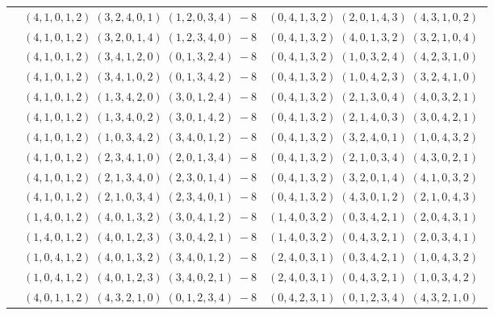 \documentclass[11pt]{article}
\begin{document}
\begin{longtable}[l]{|c|c|c|}
 \cline{2-3} 
 & $(4 ,1 ,0 ,1 ,2) \;(3 ,2 ,4 ,0 ,1) \;(1 ,2 ,0 ,3 ,4) \;-8$ & $(0 ,4 ,1 ,3 ,2) \;(2 ,0 ,1 ,4 ,3) \;(4 ,3 ,1 ,0 ,2) \;$\\ 
 \cline{2-3} 
 & $(4 ,1 ,0 ,1 ,2) \;(3 ,2 ,0 ,1 ,4) \;(1 ,2 ,3 ,4 ,0) \;-8$ & $(0 ,4 ,1 ,3 ,2) \;(4 ,0 ,1 ,3 ,2) \;(3 ,2 ,1 ,0 ,4) \;$\\ 
 \cline{2-3} 
 & $(4 ,1 ,0 ,1 ,2) \;(3 ,4 ,1 ,2 ,0) \;(0 ,1 ,3 ,2 ,4) \;-8$ & $(0 ,4 ,1 ,3 ,2) \;(1 ,0 ,3 ,2 ,4) \;(4 ,2 ,3 ,1 ,0) \;$\\ 
 \cline{2-3} 
 & $(4 ,1 ,0 ,1 ,2) \;(3 ,4 ,1 ,0 ,2) \;(0 ,1 ,3 ,4 ,2) \;-8$ & $(0 ,4 ,1 ,3 ,2) \;(1 ,0 ,4 ,2 ,3) \;(3 ,2 ,4 ,1 ,0) \;$\\ 
 \cline{2-3} 
 & $(4 ,1 ,0 ,1 ,2) \;(1 ,3 ,4 ,2 ,0) \;(3 ,0 ,1 ,2 ,4) \;-8$ & $(0 ,4 ,1 ,3 ,2) \;(2 ,1 ,3 ,0 ,4) \;(4 ,0 ,3 ,2 ,1) \;$\\ 
 \cline{2-3} 
 & $(4 ,1 ,0 ,1 ,2) \;(1 ,3 ,4 ,0 ,2) \;(3 ,0 ,1 ,4 ,2) \;-8$ & $(0 ,4 ,1 ,3 ,2) \;(2 ,1 ,4 ,0 ,3) \;(3 ,0 ,4 ,2 ,1) \;$\\ 
 \cline{2-3} 
 & $(4 ,1 ,0 ,1 ,2) \;(1 ,0 ,3 ,4 ,2) \;(3 ,4 ,0 ,1 ,2) \;-8$ & $(0 ,4 ,1 ,3 ,2) \;(3 ,2 ,4 ,0 ,1) \;(1 ,0 ,4 ,3 ,2) \;$\\ 
 \cline{2-3} 
 & $(4 ,1 ,0 ,1 ,2) \;(2 ,3 ,4 ,1 ,0) \;(2 ,0 ,1 ,3 ,4) \;-8$ & $(0 ,4 ,1 ,3 ,2) \;(2 ,1 ,0 ,3 ,4) \;(4 ,3 ,0 ,2 ,1) \;$\\ 
 \cline{2-3} 
 & $(4 ,1 ,0 ,1 ,2) \;(2 ,1 ,3 ,4 ,0) \;(2 ,3 ,0 ,1 ,4) \;-8$ & $(0 ,4 ,1 ,3 ,2) \;(3 ,2 ,0 ,1 ,4) \;(4 ,1 ,0 ,3 ,2) \;$\\ 
 \cline{2-3} 
 & $(4 ,1 ,0 ,1 ,2) \;(2 ,1 ,0 ,3 ,4) \;(2 ,3 ,4 ,0 ,1) \;-8$ & $(0 ,4 ,1 ,3 ,2) \;(4 ,3 ,0 ,1 ,2) \;(2 ,1 ,0 ,4 ,3) \;$\\ 
 \cline{2-3} 
 & $(1 ,4 ,0 ,1 ,2) \;(4 ,0 ,1 ,3 ,2) \;(3 ,0 ,4 ,1 ,2) \;-8$ & $(1 ,4 ,0 ,3 ,2) \;(0 ,3 ,4 ,2 ,1) \;(2 ,0 ,4 ,3 ,1) \;$\\ 
 \cline{2-3} 
 & $(1 ,4 ,0 ,1 ,2) \;(4 ,0 ,1 ,2 ,3) \;(3 ,0 ,4 ,2 ,1) \;-8$ & $(1 ,4 ,0 ,3 ,2) \;(0 ,4 ,3 ,2 ,1) \;(2 ,0 ,3 ,4 ,1) \;$\\ 
 \cline{2-3} 
 & $(1 ,0 ,4 ,1 ,2) \;(4 ,0 ,1 ,3 ,2) \;(3 ,4 ,0 ,1 ,2) \;-8$ & $(2 ,4 ,0 ,3 ,1) \;(0 ,3 ,4 ,2 ,1) \;(1 ,0 ,4 ,3 ,2) \;$\\ 
 \cline{2-3} 
 & $(1 ,0 ,4 ,1 ,2) \;(4 ,0 ,1 ,2 ,3) \;(3 ,4 ,0 ,2 ,1) \;-8$ & $(2 ,4 ,0 ,3 ,1) \;(0 ,4 ,3 ,2 ,1) \;(1 ,0 ,3 ,4 ,2) \;$\\ 
 \cline{2-3} 
 & $(4 ,0 ,1 ,1 ,2) \;(4 ,3 ,2 ,1 ,0) \;(0 ,1 ,2 ,3 ,4) \;-8$ & $(0 ,4 ,2 ,3 ,1) \;(0 ,1 ,2 ,3 ,4) \;(4 ,3 ,2 ,1 ,0) \;$\\ 

\end{longtable}
\end{document}

